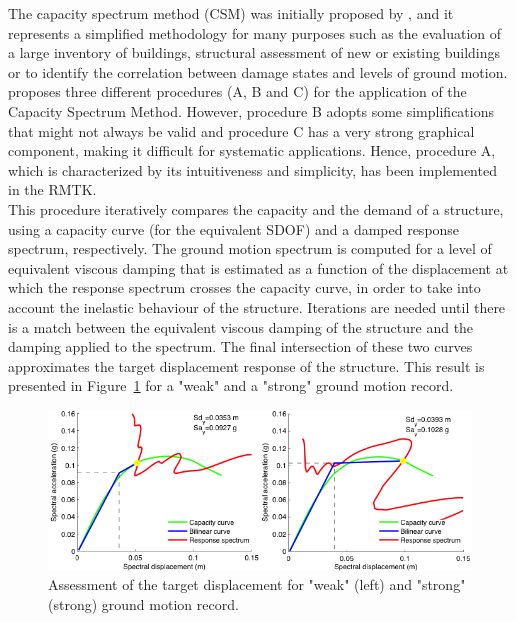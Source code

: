 The capacity spectrum method (CSM) was initially proposed by \citep{FreemanEtAl1975}, and it represents a simplified methodology for many purposes such as the evaluation of a large inventory of buildings, structural assessment of new or existing buildings or to identify the correlation between damage states and levels of ground motion. \citet{ATC1996} proposes three different procedures (A, B and C) for the application of the Capacity Spectrum Method. However, procedure B adopts some simplifications that might not always be valid and procedure C has a very strong graphical component, making it difficult for systematic applications. Hence, procedure A, which is characterized by its intuitiveness and simplicity, has been implemented in the RMTK.\\

This procedure iteratively compares the capacity and the demand of a structure, using a capacity curve (for the equivalent SDOF) and a damped response spectrum, respectively. The ground motion spectrum is computed for a level of equivalent viscous damping that is estimated as a function of the displacement at which the response spectrum crosses the capacity curve, in order to take into account the inelastic behaviour of the structure. Iterations are needed until there is a match between the equivalent viscous damping of the structure and the damping applied to the spectrum. The final intersection of these two curves approximates the target displacement response of the structure. This result is presented in Figure~\ref{fig:per_point} for a "weak" and a "strong" ground motion record. \\

\begin{figure}[htb]
  \centering
      \includegraphics[width=12cm]{Figures/performance_points.png}
  \caption{Assessment of the target displacement for "weak" (left) and "strong" (strong) ground motion record.}
  \label{fig:per_point}
\end{figure}

